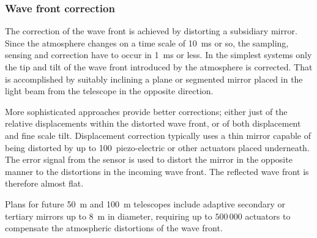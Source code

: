 \subsubsection{Wave front correction}
The correction of the wave front is achieved
by distorting a subsidiary mirror. Since the atmosphere changes on a time
scale of 10~ms or so, the sampling, sensing and correction have to occur in
1~ms or less. In the simplest systems only the tip and tilt of the wave
front introduced by the atmosphere is corrected. That is accomplished by 
suitably inclining a plane or segmented mirror placed in the light beam
from the telescope in the opposite direction. 

More sophisticated approaches provide better corrections; either just
of the relative displacements within the distorted wave front, or of both
displacement and fine scale tilt. Displacement correction typically uses
a thin mirror capable of being distorted by up to 100~piezo-electric or other
actuators placed underneath. The error signal from the sensor is used to
distort the mirror in the opposite manner to the distortions in the incoming
wave front. The reflected wave front is therefore almost flat.

Plans for future 50~m and 100~m telescopes include adaptive secondary or
tertiary mirrors up to 8~m in diameter, requiring up to $500\,000$ actuators
to compensate the atmospheric distortions of the wave front.

